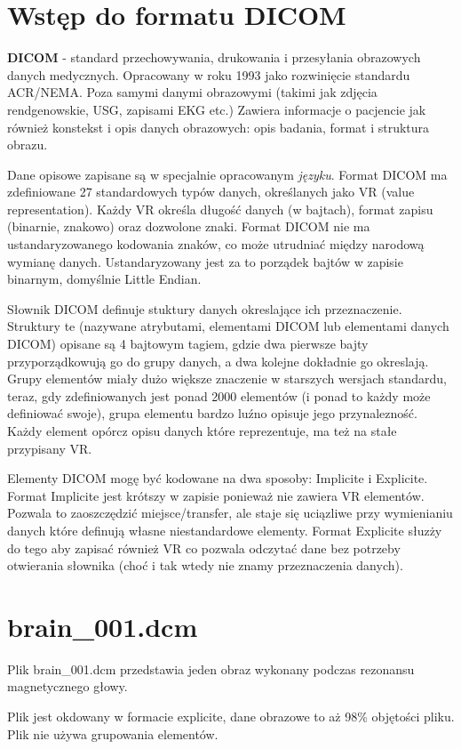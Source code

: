 \documentclass[11pt,a4paper]{article}
\begin{document}
\section{Wstęp do formatu DICOM}

\textbf{DICOM} - standard przechowywania, drukowania i przesyłania obrazowych danych
medycznych. Opracowany w roku 1993 jako rozwinięcie standardu ACR/NEMA. Poza
samymi danymi obrazowymi (takimi jak zdjęcia rendgenowskie, USG, zapisami EKG
etc.) Zawiera informacje o pacjencie jak również konstekst i opis danych
obrazowych: opis badania, format i struktura obrazu.

Dane opisowe zapisane są w specjalnie opracowanym \emph{języku}. Format DICOM
ma zdefiniowane 27 standardowych typów danych, określanych jako VR (value
representation). Każdy VR określa długość danych (w bajtach), format zapisu
(binarnie, znakowo) oraz dozwolone znaki. Format DICOM nie ma ustandaryzowanego
kodowania znaków, co może utrudniać między narodową wymianę danych.
Ustandaryzowany jest za to porządek bajtów w zapisie binarnym, domyślnie
Little Endian.

Słownik DICOM definuje stuktury danych okreslające ich przeznaczenie. Struktury
te (nazywane atrybutami, elementami DICOM lub elementami danych DICOM) opisane
są 4 bajtowym tagiem, gdzie dwa pierwsze bajty przyporządkowują go do grupy
danych, a dwa kolejne dokładnie go okreslają. Grupy elementów miały dużo
większe znaczenie w starszych wersjach standardu, teraz, gdy zdefiniowanych
jest ponad 2000 elementów (i ponad to każdy może definiować swoje), grupa
elementu bardzo luźno opisuje jego przynalezność. Każdy element opórcz opisu
danych które reprezentuje, ma też na stałe przypisany VR.

Elementy DICOM mogę być kodowane na dwa sposoby: Implicite i Explicite. Format
Implicite jest krótszy w zapisie ponieważ nie zawiera VR elementów. Pozwala to
zaoszczędzić miejsce/transfer, ale staje się uciązliwe przy wymienianiu danych
które definują własne niestandardowe elementy. Format Explicite słuzży do tego
aby zapisać również VR co pozwala odczytać dane bez potrzeby otwierania
słownika (choć i tak wtedy nie znamy przeznaczenia danych).

\section{brain\_001.dcm}
Plik brain\_001.dcm przedstawia jeden obraz wykonany podczas rezonansu
magnetycznego głowy.

Plik jest okdowany w formacie explicite, dane obrazowe to aż 98\% objętości
pliku. Plik nie używa grupowania elementów.
\end{document}
